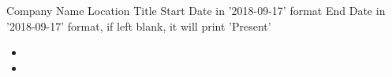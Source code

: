 \roleheader
    {Company Name}
    {Location}
    {Title}
    {Start Date in '2018-09-17' format}
    {End Date in '2018-09-17' format, if left blank, it will print 'Present'}

\begin{itemize}
    \item 
    \item 
\end{itemize}
